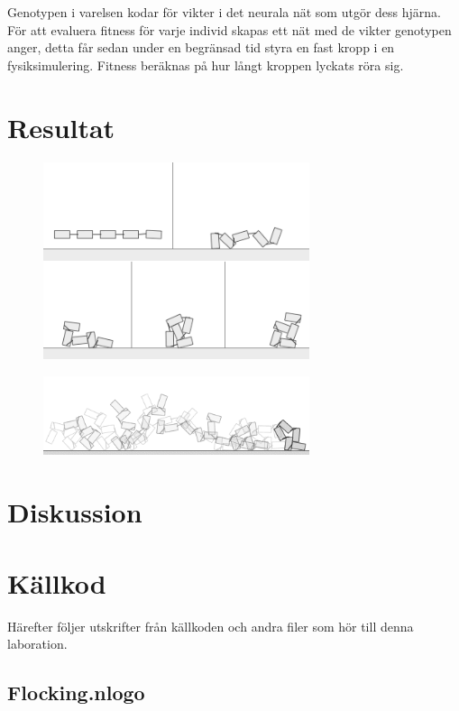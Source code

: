 \documentclass[titlepage, twocolumn, a4paper, 12pt]{article}
\begin{document}
Genotypen i varelsen kodar för vikter i det neurala nät som utgör dess hjärna. För att evaluera fitness för varje individ skapas ett nät med de vikter genotypen anger, detta får sedan under en begränsad tid styra en fast kropp i en fysiksimulering. Fitness beräknas på hur långt kroppen lyckats röra sig.

\section{Resultat}
\begin{figure}
    \includegraphics[width=78mm]{images/mask1_gs.png}
\end{figure}

\begin{figure}
    \includegraphics[width=78mm]{images/maskninja.png}
\end{figure}
\section{Diskussion}




\newpage
\appendix
{}
\section{Källkod}\label{sec:kallkod}
Härefter följer utskrifter från källkoden och andra filer som hör till
denna laboration.

\subsection{Flocking.nlogo}\label{app:Flocking.nlogo}
\begin{footnotesize}
  
\end{footnotesize}
\end{document}

